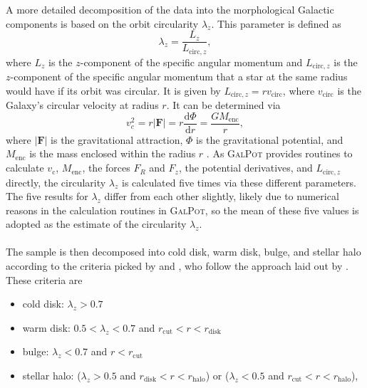 \documentclass[a4paper,11pt]{article}
\begin{document}
%
A more detailed decomposition of the data into the morphological Galactic components is based on the orbit circularity $\lambda_z$. This parameter is defined as
%
\begin{equation}
 \lambda_z=\frac{L_z}{L_{\mathrm{circ},z}},
\end{equation}
%
where $L_z$ is the $z$-component of the specific angular momentum and $L_{\mathrm{circ},z}$ is the $z$-component of the specific angular momentum that a star at the same radius would have if its orbit was circular. It is given by $L_{\mathrm{circ},z}=rv_\mathrm{circ}$, where $v_\mathrm{circ}$ is the Galaxy's circular velocity at radius $r$. It can be determined via
%
\begin{equation}
 v_c^2=r|\bm{F}|=r\frac{\mathrm{d}\Phi}{\mathrm{d}r}=\frac{GM_\mathrm{enc}}{r},
\end{equation}
%
where $|\bm{F}|$ is the gravitational attraction, $\Phi$ is the gravitational potential, and $M_\mathrm{enc}$ is the mass enclosed within the radius $r$ \citep[][p. 62]{binney08}. As \textsc{GalPot} provides routines to calculate $v_\mathrm{c}$, $M_\mathrm{enc}$, the forces $F_R$ and $F_z$, the potential derivatives, and $L_{\mathrm{circ},z}$ directly, the circularity $\lambda_z$ is calculated five times via these different parameters. The five results for $\lambda_z$ differ from each other slightly, likely due to numerical reasons in the calculation routines in \textsc{GalPot}, so the mean of these five values is adopted as the estimate of the circularity $\lambda_z$.\\ \\
%
The sample is then decomposed into cold disk, warm disk, bulge, and stellar halo according to the criteria picked by \citet{sotillo23} and \citet{chen23}, who follow the approach laid out by \citet{zhu22}. These criteria are
%
\begin{itemize}
 \item cold disk: $\lambda_z>0.7$
 \item warm disk: $0.5<\lambda_z<0.7$ and $r_\mathrm{cut}<r<r_\mathrm{disk}$
 \item bulge: $\lambda_z<0.7$ and $r<r_\mathrm{cut}$
 \item stellar halo: ($\lambda_z>0.5$ and $r_\mathrm{disk}<r<r_\mathrm{halo}$) or ($\lambda_z<0.5$ and $r_\mathrm{cut}<r<r_\mathrm{halo}$),
\end{itemize}
%
\end{document}
